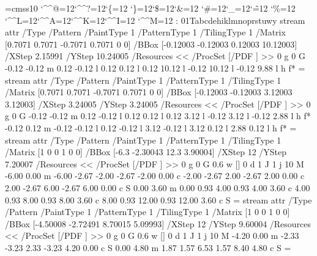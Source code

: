 \font\THFa=cmss10
\begingroup
\catcode`\^^@=12\catcode`\^^?=12\catcode`\{=12
\catcode`\}=12\catcode`\$=12\catcode`\&=12
\catcode`\#=12\catcode`\_=12\catcode`\~=12
\catcode`\%=12
\catcode`\^^L=12\catcode`\^^A=12\catcode`\^^K=12\catcode`\^^I=12
\catcode`\^^M=12
\THFa:^^M01Tabcdehiklmnoprstuwy\endinclude\endgroup
\immediate\pdfobj stream attr {/Type /Pattern
/PaintType 1 /PatternType 1 /TilingType 1
/Matrix [0.7071 0.7071 -0.7071 0.7071 0 0]
/BBox [-0.12003 -0.12003 0.12003 10.12003]
/XStep 2.15991
/YStep 10.24005
/Resources << /ProcSet [/PDF ] >> } {0 g 0 G 
-0.12 -0.12 m
0.12 -0.12 l
0.12 0.12 l
0.12 10.12 l
-0.12 10.12 l
-0.12 9.88 l
h
f*
} \newcount \THPc\THPc=\pdflastobj
\immediate\pdfobj stream attr {/Type /Pattern
/PaintType 1 /PatternType 1 /TilingType 1
/Matrix [0.7071 0.7071 -0.7071 0.7071 0 0]
/BBox [-0.12003 -0.12003 3.12003 3.12003]
/XStep 3.24005
/YStep 3.24005
/Resources << /ProcSet [/PDF ] >> } {0 g 0 G 
-0.12 -0.12 m
0.12 -0.12 l
0.12 0.12 l
0.12 3.12 l
-0.12 3.12 l
-0.12 2.88 l
h
f*
-0.12 0.12 m
-0.12 -0.12 l
0.12 -0.12 l
3.12 -0.12 l
3.12 0.12 l
2.88 0.12 l
h
f*
} \newcount \THPd\THPd=\pdflastobj
\immediate\pdfobj stream attr {/Type /Pattern
/PaintType 1 /PatternType 1 /TilingType 1
/Matrix [1 0 0 1 0 0]
/BBox [-6.3 -2.30043 12.3 3.90004]
/XStep 12
/YStep 7.20007
/Resources << /ProcSet [/PDF ] >> } {0 g 0 G 
0.6 w
[] 0 d
1 J
1 j
10 M
-6.00 0.00 m
-6.00 -2.67 -2.00 -2.67 -2.00 0.00 c
-2.00 -2.67 2.00 -2.67 2.00 0.00 c
2.00 -2.67 6.00 -2.67 6.00 0.00 c
S
0.00 3.60 m
0.00 0.93 4.00 0.93 4.00 3.60 c
4.00 0.93 8.00 0.93 8.00 3.60 c
8.00 0.93 12.00 0.93 12.00 3.60 c
S
} \newcount \THPb\THPb=\pdflastobj
\immediate\pdfobj stream attr {/Type /Pattern
/PaintType 1 /PatternType 1 /TilingType 1
/Matrix [1 0 0 1 0 0]
/BBox [-4.50008 -2.72491 8.70015 5.09993]
/XStep 12
/YStep 9.60004
/Resources << /ProcSet [/PDF ] >> } {0 g 0 G 
0.6 w
[] 0 d
1 J
1 j
10 M
-4.20 0.00 m
-2.33 -3.23 2.33 -3.23 4.20 0.00 c
S
0.00 4.80 m
1.87 1.57 6.53 1.57 8.40 4.80 c
S
} \newcount \THPa\THPa=\pdflastobj
